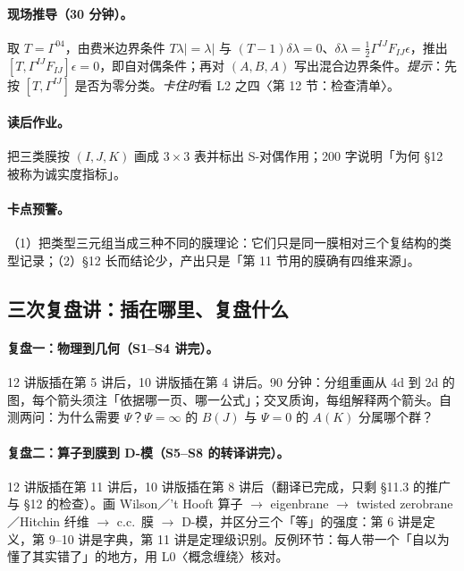 {\paragraph{现场推导（30 分钟）。}取 \(T=\Gamma^{04}\)，由费米边界条件 \(T\lambda|=\lambda|\) 与 \((T-1)\delta\lambda=0\)、\(\delta\lambda=\frac12\Gamma^{IJ}F_{IJ}\epsilon\)，推出 \([T,\Gamma^{IJ}F_{IJ}]\epsilon=0\)，即自对偶条件；再对 \((A,B,A)\) 写出混合边界条件。\emph{提示}：先按 \([T,\Gamma^{IJ}]\) 是否为零分类。\emph{卡住时}看 L2 之四〈第 12 节：检查清单〉。\pC

\paragraph{读后作业。}把三类膜按 \((I,J,K)\) 画成 \(3\times3\) 表并标出 S-对偶作用；200 字说明「为何 §12 被称为诚实度指标」。\pC

\paragraph{卡点预警。}（1）把类型三元组当成三种不同的膜理论：它们只是同一膜相对三个复结构的类型记录；（2）§12 长而结论少，产出只是「第 11 节用的膜确有四维来源」。\pC

\subsection{三次复盘讲：插在哪里、复盘什么}

\paragraph{复盘一：物理到几何（S1--S4 讲完）。}12 讲版插在第 5 讲后，10 讲版插在第 4 讲后。90 分钟：分组重画从 4d 到 2d 的图，每个箭头须注「依据哪一页、哪一公式」；交叉质询，每组解释两个箭头。自测两问：为什么需要 \(\Psi\)？\(\Psi=\infty\) 的 \(B(J)\) 与 \(\Psi=0\) 的 \(A(K)\) 分属哪个群？\pC

\paragraph{复盘二：算子到膜到 D-模（S5--S8 的转译讲完）。}12 讲版插在第 11 讲后，10 讲版插在第 8 讲后（翻译已完成，只剩 §11.3 的推广与 §12 的检查）。画 Wilson／'t Hooft 算子 \(\to\) eigenbrane \(\to\) twisted zerobrane／Hitchin 纤维 \(\to\) c.c.\ 膜 \(\to\) D-模，并区分三个「等」的强度：第 6 讲是定义，第 9--10 讲是字典，第 11 讲是定理级识别。反例环节：每人带一个「自以为懂了其实错了」的地方，用 L0〈概念缠绕〉核对。\pC

}
